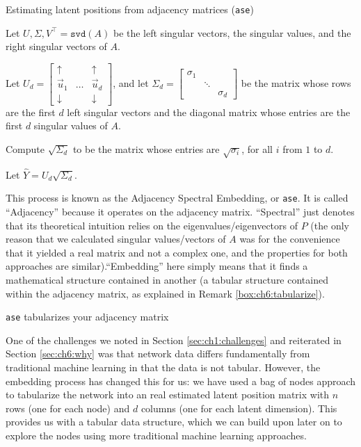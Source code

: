 \begin{algorithm}[h]\caption{Estimating latent positions from adjacency matrices (\texttt{ase})}
\label{alg:ch6:ase}
\SetAlgoLined
Let $U, \Sigma, V^\top = \texttt{svd}(A)$ be the left singular vectors, the singular values, and the right singular vectors of $A$.

Let $U_d = \begin{bmatrix}
    \uparrow & & \uparrow \\
    \vec u_1 & \hdots & \vec u_d \\
    \downarrow & & \downarrow
\end{bmatrix}$, and let $\Sigma_d = \begin{bmatrix}
    \sigma_1 & & \\
    & \ddots & \\
    & & \sigma_d
\end{bmatrix}$ be the matrix whose rows are the first $d$ left singular vectors and the diagonal matrix whose entries are the first $d$ singular values of $A$.

Compute $\sqrt{\Sigma_d}$ to be the matrix whose entries are $\sqrt{\sigma_i}$, for all $i$ from $1$ to $d$.

Let $\hat Y = U_d \sqrt{\Sigma_d}$.

\end{algorithm}

This process is known as the Adjacency Spectral Embedding, or \texttt{ase}. It is called ``Adjacency'' because it operates on the adjacency matrix. ``Spectral'' just denotes that its theoretical intuition relies on the eigenvalues/eigenvectors of $P$ (the only reason that we calculated singular values/vectors of $A$ was for the convenience that it yielded a real matrix and not a complex one, and the properties for both approaches are similar).``Embedding'' here simply means that it finds a mathematical structure contained in another (a tabular structure contained within the adjacency matrix, as explained in Remark \ref{box:ch6:tabularize}). 


\begin{floatingbox}[h]\caption{\texttt{ase} tabularizes your adjacency matrix}
\label{box:ch6:tabularize}
One of the challenges we noted in Section \ref{sec:ch1:challenges} and reiterated in Section \ref{sec:ch6:why} was that network data differs fundamentally  from traditional machine learning in that the data is not tabular. However, the embedding process has changed this for us: we have used a bag of nodes approach to tabularize the network into an real estimated latent position matrix with $n$ rows (one for each node) and $d$ columns (one for each latent dimension). This provides us with a tabular data structure, which we can build upon later on to explore the nodes using more traditional machine learning approaches. 
\end{floatingbox}


